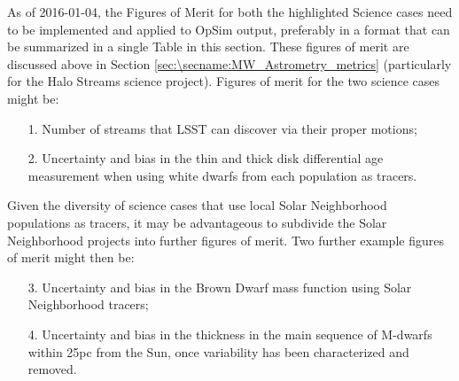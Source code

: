 As of 2016-01-04, the Figures of Merit for both the highlighted
Science cases need to be implemented and applied to OpSim output,
preferably in a format that can be summarized in a single Table in
this section. These figures of merit are discussed above in Section
\ref{sec:\secname:MW_Astrometry_metrics} (particularly for the Halo
Streams science project). Figures of merit for the two science cases
might be:
\begin{itemize}
  \item[1.] Number of streams that LSST can discover via their proper motions;
\item[2.] Uncertainty and bias in the thin and thick disk differential age measurement when using white dwarfs from each population as tracers.
\end{itemize}

Given the diversity of science cases that use local Solar Neighborhood
populations as tracers, it may be advantageous to subdivide the Solar
Neighborhood projects into further figures of merit. Two further example
figures of merit might then be:
\begin{itemize}
  \item[3.] Uncertainty and bias in the Brown Dwarf mass function using Solar Neighborhood tracers;
   \item[4.] Uncertainty and bias in the thickness in the main sequence of M-dwarfs within 25pc from the Sun, once variability has been characterized and removed.
\end{itemize}


